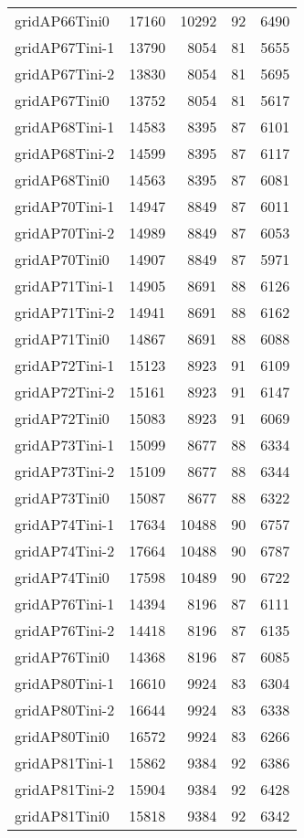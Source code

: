 \begin{longtable}{lrrrr}
gridAP66Tini0 & 17160 & 10292 & 92 & 6490 \\
gridAP67Tini-1 & 13790 & 8054 & 81 & 5655 \\
gridAP67Tini-2 & 13830 & 8054 & 81 & 5695 \\
gridAP67Tini0 & 13752 & 8054 & 81 & 5617 \\
gridAP68Tini-1 & 14583 & 8395 & 87 & 6101 \\
gridAP68Tini-2 & 14599 & 8395 & 87 & 6117 \\
gridAP68Tini0 & 14563 & 8395 & 87 & 6081 \\
gridAP70Tini-1 & 14947 & 8849 & 87 & 6011 \\
gridAP70Tini-2 & 14989 & 8849 & 87 & 6053 \\
gridAP70Tini0 & 14907 & 8849 & 87 & 5971 \\
gridAP71Tini-1 & 14905 & 8691 & 88 & 6126 \\
gridAP71Tini-2 & 14941 & 8691 & 88 & 6162 \\
gridAP71Tini0 & 14867 & 8691 & 88 & 6088 \\
gridAP72Tini-1 & 15123 & 8923 & 91 & 6109 \\
gridAP72Tini-2 & 15161 & 8923 & 91 & 6147 \\
gridAP72Tini0 & 15083 & 8923 & 91 & 6069 \\
gridAP73Tini-1 & 15099 & 8677 & 88 & 6334 \\
gridAP73Tini-2 & 15109 & 8677 & 88 & 6344 \\
gridAP73Tini0 & 15087 & 8677 & 88 & 6322 \\
gridAP74Tini-1 & 17634 & 10488 & 90 & 6757 \\
gridAP74Tini-2 & 17664 & 10488 & 90 & 6787 \\
gridAP74Tini0 & 17598 & 10489 & 90 & 6722 \\
gridAP76Tini-1 & 14394 & 8196 & 87 & 6111 \\
gridAP76Tini-2 & 14418 & 8196 & 87 & 6135 \\
gridAP76Tini0 & 14368 & 8196 & 87 & 6085 \\
gridAP80Tini-1 & 16610 & 9924 & 83 & 6304 \\
gridAP80Tini-2 & 16644 & 9924 & 83 & 6338 \\
gridAP80Tini0 & 16572 & 9924 & 83 & 6266 \\
gridAP81Tini-1 & 15862 & 9384 & 92 & 6386 \\
gridAP81Tini-2 & 15904 & 9384 & 92 & 6428 \\
gridAP81Tini0 & 15818 & 9384 & 92 & 6342 \\

\end{longtable}
